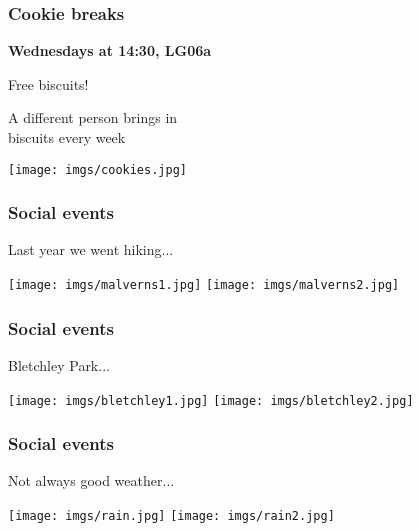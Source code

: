 \begin{frame}
    \frametitle{Cookie breaks}
    \centering

    \textbf{\LARGE Wednesdays at 14:30, LG06a}

    \vspace{1em}

    \begin{minipage}{0.4\textwidth}
        \centering
        \Large

        \alert{Free biscuits!}

        \vspace{1em}

        A different person brings in \\
        biscuits every week
    \end{minipage}
    \qquad
    \begin{minipage}{0.4\textwidth}
        \texttt{[image: imgs/cookies.jpg]}
    \end{minipage}
\end{frame}
\begin{frame}
    \frametitle{Social events}
    \centering

    \Large
    Last year we went hiking...

    \vspace{1em}

    \texttt{[image: imgs/malverns1.jpg]}
    \texttt{[image: imgs/malverns2.jpg]}


\end{frame}
\begin{frame}
    \frametitle{Social events}
    \centering

    \Large
    Bletchley Park...

    \vspace{1em}

    \texttt{[image: imgs/bletchley1.jpg]}
    \texttt{[image: imgs/bletchley2.jpg]}

\end{frame}

\begin{frame}
    \frametitle{Social events}
    \centering

    \Large
    Not always good weather...

    \vspace{1em}

    \texttt{[image: imgs/rain.jpg]}
    \texttt{[image: imgs/rain2.jpg]}

\end{frame}


